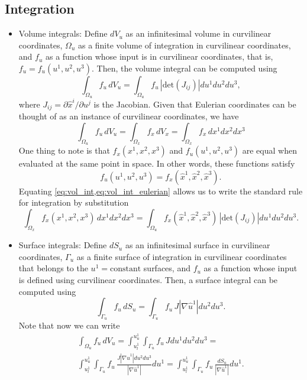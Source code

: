 \documentclass[11pt]{article}
\begin{document}
\subsection{Integration}
\begin{itemize}

\item Volume integrals: Define $d V_u$ as an infinitesimal volume in curvilinear coordinates, $\Omega_u$ as a finite volume of integration in curvilinear coordinates, and $f_u$ as a function whose input is in curvilinear coordinates, that is, $f_u = f_u(u^1,u^2,u^3)$. Then, the volume integral can be computed using
\begin{equation}
\label{eq:vol_int}
    \int_{\Omega_u} f_u \, d V_u = \int_{\Omega_u} f_u \, |\text{det}(J_{ij})| du^1 du^2 du^3,
\end{equation}
where $J_{ij} = \partial \hat{x}^i / \partial u^j$ is the Jacobian. Given that Eulerian coordinates can be thought of as an instance of curvilinear coordinates, we have
\begin{equation}
\label{eq:vol_int_eulerian}
    \int_{\Omega_u} f_u \, dV_u =  \int_{\Omega_x} f_x \, dV_x = \int_{\Omega_x} f_x \, dx^1 dx^2 dx^3 
\end{equation}
One thing to note is that $f_x(x^1,x^2,x^3)$ and $f_u(u^1,u^2,u^3)$ are equal when evaluated at the same point in space.
In other words, these functions satisfy
\begin{equation}
    f_u(u^1,u^2,u^3) = f_x(\hat{x}^1, \hat{x}^2, \hat{x}^3).
\end{equation}
Equating \cref{eq:vol_int,eq:vol_int_eulerian} allows us to write the standard rule for integration by substitution
\begin{equation}
    \int_{\Omega_x} f_x(x^1,x^2,x^3) \, dx^1 dx^2 dx^3 = \int_{\Omega_u} f_x(\hat{x}^1, \hat{x}^2, \hat{x}^3) \, |\text{det}(J_{ij})| du^1 du^2 du^3 .
\end{equation}

\item Surface integrals: Define $d S_u$ as an infinitesimal surface in curvilinear coordinates, $\Gamma_u$ as a finite surface of integration in curvilinear coordinates that belongs to the $u^1 = \text{constant}$ surfaces, and $f_u$ as a function whose input is defined using curvilinear coordinates. Then, a surface integral can be computed using 
\begin{equation}
    \int_{\Gamma_u} f_u\, d S_u = \int_{\Gamma_u} f_u \, J | \nabla \hat{u}^1| du^2 du^3.
\end{equation}
Note that now we can write
\begin{multline}
\label{eq:int_from_vol_surf}
    \int_{\Omega_u} f_u \,dV_u = \int_{u^1_l}^{u^1_u} \int_{\Gamma_u} f_u \, J du^1 du^2 du^3 = \\ 
    \int_{u^1_l}^{u^1_u} \int_{\Gamma_u} f_u \, \frac{J | \nabla \hat{u}^1| du^2 du^3}{| \nabla \hat{u}^1 |} du^1 = \int_{u^1_l}^{u^1_u} \int_{\Gamma_u} f_u \, \frac{dS_u}{|\nabla \hat{u}^1|} du^1.
\end{multline}

\end{itemize}
\end{document}
